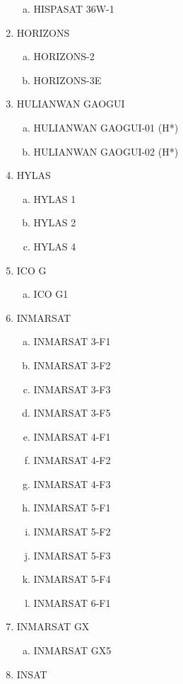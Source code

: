 \begin{multicols}{2}
\begin{enumerate}
\begin{enumerate}[a.]
    \item HISPASAT 36W-1
  \end{enumerate}
  \item HORIZONS
  \begin{enumerate}[a.]
    \item HORIZONS-2
    \item HORIZONS-3E
  \end{enumerate}
  \item HULIANWAN GAOGUI
  \begin{enumerate}[a.]
    \item HULIANWAN GAOGUI-01 (H*)
    \item HULIANWAN GAOGUI-02 (H*)
  \end{enumerate}
  \item HYLAS
  \begin{enumerate}[a.]
    \item HYLAS 1
    \item HYLAS 2
    \item HYLAS 4
  \end{enumerate}
  \item ICO G
  \begin{enumerate}[a.]
    \item ICO G1
  \end{enumerate}
  \item INMARSAT
  \begin{enumerate}[a.]
    \item INMARSAT 3-F1
    \item INMARSAT 3-F2
    \item INMARSAT 3-F3
    \item INMARSAT 3-F5
    \item INMARSAT 4-F1
    \item INMARSAT 4-F2
    \item INMARSAT 4-F3
    \item INMARSAT 5-F1
    \item INMARSAT 5-F2
    \item INMARSAT 5-F3
    \item INMARSAT 5-F4
    \item INMARSAT 6-F1
  \end{enumerate}
  \item INMARSAT GX
  \begin{enumerate}[a.]
    \item INMARSAT GX5
  \end{enumerate}
  \item INSAT
  \begin{enumerate}[a.]

\end{enumerate}
\end{enumerate}
\end{multicols}
